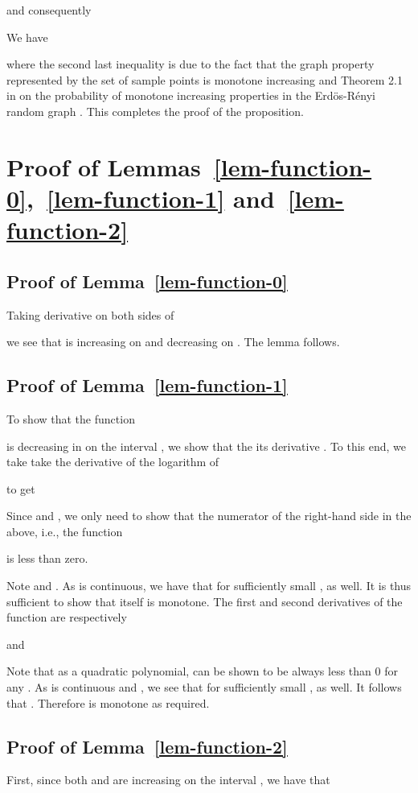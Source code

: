 \documentclass[11pt]{article}
\providecommand{\qed}{\hfill }
\begin{document}
and consequently
 
We have

where the second last inequality is due to the fact that the graph property represented 
by the set of sample points   is 
monotone increasing and Theorem 2.1 in \cite{bollobas01} on the probability 
of monotone increasing properties in the Erd\"{o}s-R\'{e}nyi random graph .  
This completes the proof of the proposition.
\qed
 
\section{Proof of Lemmas~\ref{lem-function-0},~\ref{lem-function-1} and~\ref{lem-function-2}}
\label{appendix-2}


\subsection{Proof of Lemma~\ref{lem-function-0}}
Taking derivative on both sides of 

we see that  is increasing on  and decreasing
on . The lemma follows.
\qed

\subsection{Proof of Lemma~\ref{lem-function-1}}
To show that the function

is decreasing in  on the interval , we show that
the its derivative . 
To this end, we take take the derivative of the logarithm of   

to get

Since  and , 
we only need to show that the numerator of the right-hand
side in the above, i.e.,
the function

is less than zero.
 
Note  and
. As  is continuous, we have 
that for sufficiently small ,  as well.     
It is thus sufficient to show
that  itself is monotone. The first and second derivatives of the function
 are respectively

and

Note that as a quadratic polynomial,
 can be shown to be always less
than 0 for any .  As  is continuous and
, we see that for sufficiently small
,  as well.
It follows that
. Therefore
 is monotone as required.
\qed

\subsection{Proof of Lemma~\ref{lem-function-2}}
First, since both   and 
are increasing on the interval , we have that
 
\end{document}
